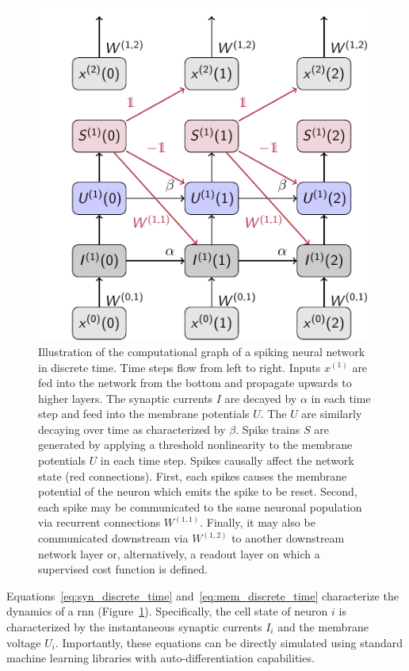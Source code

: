 \documentclass[journal,onecolumn,11pt]{IEEEtran}
\begin{document}
\begin{figure}
    \centering
    \includegraphics{figures/snn_graph.pdf}
	\caption{Illustration of the computational graph of a spiking neural network
	in discrete time. Time steps flow from left to right. Inputs $x^(1)$ are fed
	into the network from the bottom and propagate upwards to higher layers. The
	synaptic currents $I$ are decayed by $\alpha$ in each time step and feed
	into the membrane potentials $U$. The $U$ are similarly decaying over time
	as characterized by $\beta$. Spike trains $S$ are generated by applying a
	threshold nonlinearity to the membrane potentials $U$ in each time step.
	Spikes causally affect the network state (red connections).  First, each
	spikes causes the membrane potential of the neuron which emits the spike to
	be reset. Second, each spike may be communicated to the same neuronal
	population via recurrent connections $W^{(1,1)}$.  Finally, it may also be
	communicated downstream via $W^{(1,2)}$ to another downstream network layer
	or, alternatively, a readout layer on which a supervised cost function is
	defined.}
    \label{fig:snn_computational_graph}
\end{figure}

Equations~\eqref{eq:syn_discrete_time} and~\eqref{eq:mem_discrete_time}
characterize the dynamics of a \gls{rnn}
(Figure~\ref{fig:snn_computational_graph}).  Specifically, the cell state of
neuron $i$ is characterized by the instantaneous synaptic currents $I_i$ and the
membrane voltage $U_i$.  Importantly, these equations can be directly simulated
using standard machine learning libraries with auto-differentiation
capabilities.
\end{document}
